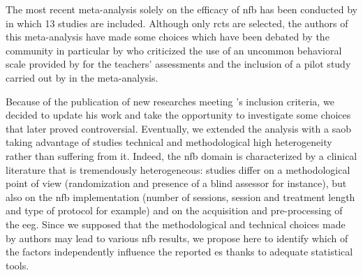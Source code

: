 
The most recent meta-analysis solely on the efficacy of \gls{nfb} has been conducted by \citet{Cortese2016} in 
which 13 studies are included. Although only \glspl{rct} are selected, the authors of 
this meta-analysis have made some choices which have been debated by the community in particular by 
\citet{Micoulaud2016} who criticized the use of an uncommon behavioral scale provided by \citet{Steiner2014}
for the teachers' assessments and the inclusion of a pilot study carried out by \citet{Arnold2014} in the meta-analysis. 

Because of the publication of new researches meeting \citeauthor{Cortese2016}'s inclusion criteria, we decided to update his work and take 
the opportunity to investigate some choices that later proved controversial. Eventually, we extended the analysis with a \gls{saob} taking 
advantage of studies technical and methodological high heterogeneity rather than suffering from it. Indeed, the \gls{nfb} 
domain is characterized by a clinical literature that is tremendously heterogeneous: studies differ on a methodological 
point of view (randomization and presence of a blind assessor for instance), but also on the \gls{nfb} implementation (number of sessions,
session and treatment length and type of protocol for example) and on the acquisition and pre-processing of the \gls{eeg}. Since we supposed that the 
methodological and technical choices made by authors may lead to various \gls{nfb} results, we propose here to identify which of the factors 
independently influence the reported \gls{es} thanks to adequate statistical tools.








